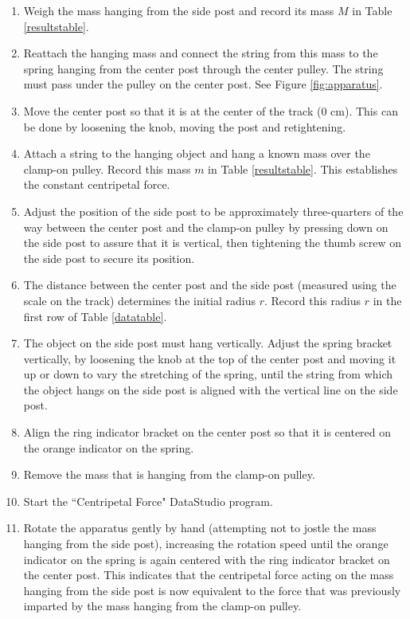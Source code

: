 \begin{enumerate}
	\item Weigh the mass hanging from the side post and record its mass $M$ in Table \ref{resultstable}.  
	\item Reattach the hanging mass and connect the string from this mass to the spring hanging from the center post through the center pulley. The string must pass under the pulley on the center post. See Figure \ref{fig:apparatus}.
	\item Move the center post so that it is at the center of the track (0 cm). This can be done by loosening the knob, moving the post and retightening.
	\item Attach a string to the hanging object and hang a known mass over the clamp-on pulley. Record this mass $m$ in Table \ref{resultstable}. This establishes the constant centripetal force.
	\item Adjust the position of the side post to be approximately three-quarters of the way between the center post and the clamp-on pulley by pressing down on the side post to assure that it is vertical, then tightening the thumb screw on the side post to secure its position.
	\item The distance between the center post and the side post (measured using the scale on the track) determines the initial radius $r$. Record this radius $r$ in the first row of Table \ref{datatable}.
	\item The object on the side post must hang vertically. Adjust the spring bracket vertically, by loosening the knob at the top of the center post and moving it up or down to vary the stretching of the spring, until the string from which the object hangs on the side post is aligned with the vertical line on the side post.
	\item Align the ring indicator bracket on the center post so that it is centered on the orange indicator on the spring.
	\item Remove the mass that is hanging from the clamp-on pulley.
	\item Start the ``Centripetal Force" DataStudio program.
	\item Rotate the apparatus gently by hand (attempting not to jostle the mass hanging from the side post), increasing the rotation speed until the orange indicator on the spring is again centered with the ring indicator bracket on the center post. This indicates that the centripetal force acting on the mass hanging from the side post is now equivalent to the force that was previously imparted by the mass hanging from the clamp-on pulley.

\end{enumerate}

